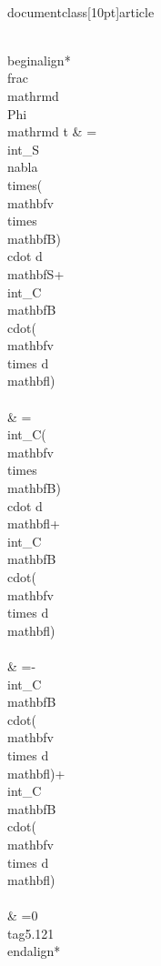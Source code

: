 \\documentclass[10pt]{article}
\begin{document}
{{{{\\begin{align*}
\\frac{\\mathrm{d} \\Phi}{\\mathrm{d} t} & =\\int_{S} \\nabla \\times(\\mathbf{v} \\times \\mathbf{B}) \\cdot d \\mathbf{S}+\\int_{C} \\mathbf{B} \\cdot(\\mathbf{v} \\times d \\mathbf{l}) \\\\
& =\\int_{C}(\\mathbf{v} \\times \\mathbf{B}) \\cdot d \\mathbf{l}+\\int_{C} \\mathbf{B} \\cdot(\\mathbf{v} \\times d \\mathbf{l}) \\\\
& =-\\int_{C} \\mathbf{B} \\cdot(\\mathbf{v} \\times d \\mathbf{l})+\\int_{C} \\mathbf{B} \\cdot(\\mathbf{v} \\times d \\mathbf{l}) \\\\
& =0 \\tag{5.121}
\\end{align*}


}}}}
\end{document}
